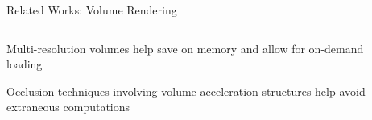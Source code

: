 \documentclass[10pt,handout,compress,professionalfont]{beamer}
\begin{document}
\begin{frame}{Related Works: Volume Rendering}

    \begin{columns}
        \begin{column}{0.7\textwidth}

    \vspace{-5mm}
    Multi-resolution volumes help save on memory and allow for on-demand loading\\
    \vspace{8mm}

    Occlusion techniques involving volume acceleration structures help avoid extraneous computations

        \end{column}
        \begin{column}{0.3\textwidth}
            \vspace{-4mm}

\end{column}
\end{columns}
\end{frame}
\end{document}
